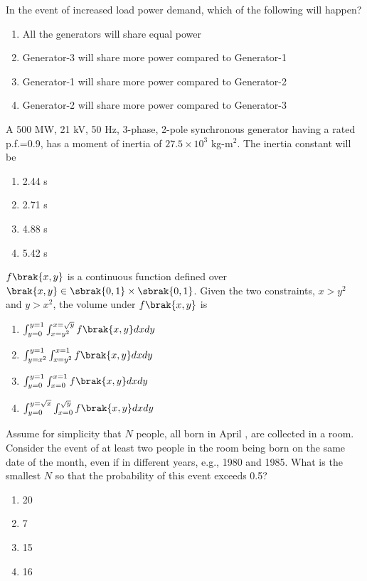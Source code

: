 In the event of increased load power demand, which of the following will happen?
\begin{enumerate}
\item All the generators will share equal power
\item Generator-3 will share more power compared to Generator-1
\item Generator-1 will share more power compared to Generator-2
\item Generator-2 will share more power compared to Generator-3
\end{enumerate}
    \item A 500 MW, 21 kV, 50 Hz, 3-phase, 2-pole synchronous generator having a rated p.f.=0.9, has a moment of inertia of $27.5 \times 10^3$ kg-m$^2$. The inertia constant  will be
    \begin{enumerate}
        \item 2.44 s
        \item 2.71 s
        \item 4.88 s
        \item 5.42 s
    \end{enumerate}
    \item $f\brak{x, y}$ is a continuous function defined over $\brak{x, y} \in \sbrak{0,1} \times \sbrak{0,1}$. Given the two constraints, $x > y^2$ and $y > x^2$, the volume under $f\brak{x, y}$ is
    \begin{enumerate}
        \item $\int_{y=0}^{y=1} \int_{x=y^2}^{x=\sqrt{y}} f\brak{x,y} dx dy$
        \item $\int_{y=x^2}^{y=1} \int_{x=y^2}^{x=1} f\brak{x,y} dx dy$
        \item $\int_{y=0}^{y=1} \int_{x=0}^{x=1} f\brak{x,y} dx dy$
        \item $\int_{y=0}^{y=\sqrt{x}} \int_{x=0}^{\sqrt{y}} f\brak{x,y} dx dy$
    \end{enumerate}
    \item Assume for simplicity that $N$ people, all born in April , are collected in a room. Consider the event of at least two people in the room being born on the same date of the month, even if in different years, e.g., 1980 and 1985. What is the smallest $N$ so that the probability of this event exceeds 0.5?
    \begin{enumerate}
        \item 20
        \item 7
        \item 15
        \item 16
    \end{enumerate}
